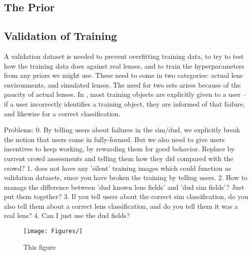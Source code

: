 \documentclass[useAMS,usenatbib,a4paper]{mn2e}
\begin{document}
\subsection{The Prior}


\subsection{Validation of Training}
\label{sec:validation}


A validation dataset is needed to prevent overfitting training data, to try
to test how the training data does against real lenses, and to train the
hyperparameters from any priors we might use. These need to come in
two categories: actual lens environments, and simulated lenses. The need for
two sets arises because of the paucity of actual lenses. In \SW, most training
objects are explicitly given to a user -- if a user incorrectly identifies a
training object, they are informed of that failure, and likewise for a correct
classification.

Problems:
0. By telling users about failures in the sim/dud, we explicitly break the
notion that users come in fully-formed. But we also need to give users
incentives to keep working, by rewarding them for good behavior. Replace by
current crowd assessments and telling them how they did compared with the
crowd?
1. \SW does not have any 'silent' training images which could function as
validation datasets, since you have broken the training by telling users.
2. How to manage the difference between 'dud known lens fields' and 'dud sim
fields'? Just put them together?
3. If you tell users about the correct sim classification, do you also tell
them about a correct lens classification, and do you tell them it was a real
lens?
4. Can I just use the dud fields?

\begin{figure}
\begin{center}
    \texttt{[image: Figures/]}
\end{center}
\caption{This figure }
\label{fig:validation}
\end{figure}
\end{document}
